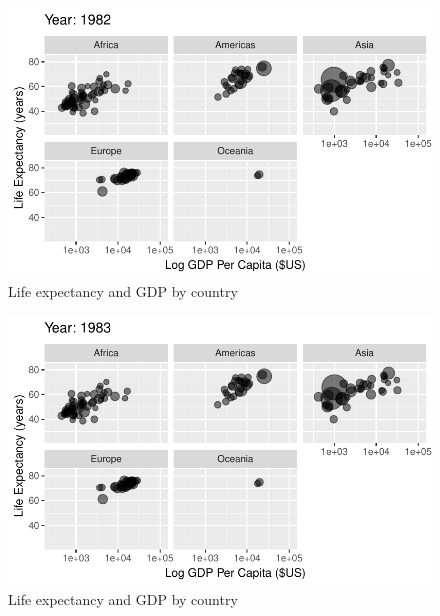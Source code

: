 \documentclass[
  letterpaper,
  DIV=11,
  numbers=noendperiod]{scrreport}
\theoremstyle{definition}
\theoremstyle{remark}
\begin{document}
\begin{figure}

{\centering \includegraphics{index_files/figure-pdf/fig-anim-lifegdp-55.pdf}

}

\caption{\label{fig-anim-lifegdp-55}Life expectancy and GDP by country}

\end{figure}

\begin{figure}

{\centering \includegraphics{index_files/figure-pdf/fig-anim-lifegdp-56.pdf}

}

\caption{\label{fig-anim-lifegdp-56}Life expectancy and GDP by country}

\end{figure}
\end{document}
